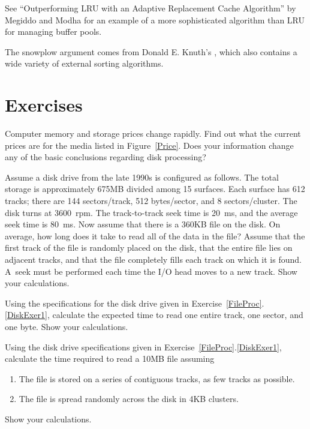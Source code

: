 See ``Outperforming LRU with an Adaptive Replacement Cache Algorithm''
by Megiddo and Modha \cite{LRU} for an example of a more sophisticated
algorithm than LRU for managing buffer pools.

The snowplow argument comes from Donald E. Knuth's
 \cite{KnuthV3}, which also contains a
wide variety of external sorting algorithms.

\section{Exercises}

\begin{exercises}

\item
Computer memory and storage prices change
rapidly.
Find out what the current prices are for the media listed in
Figure~\ref{Price}.
Does your information change any of the basic conclusions regarding
disk processing?

\item
\label{DiskExer1}
Assume a disk drive
from the late 1990s is configured as follows.
The total storage is approximately 675MB divided among 15 surfaces.
Each surface has 612 tracks; there are 144 sectors/track,
512 bytes/sector, and  8 sectors/cluster.
The disk turns at 3600~rpm.
The track-to-track seek time is 20~ms, and the average seek time is
80~ms.
Now assume that there is a 360KB file on the disk.
On average, how long does it take to read all of the data in the file?
Assume that the first track of the file is randomly placed on the
disk, that the entire file lies on adjacent tracks, and that the file
completely fills each track on which it is found.
A~seek must be performed each time the I/O head moves to a
new track.
Show your calculations.

\item
Using the specifications for the disk drive given in
Exercise~\ref{FileProc}.\ref{DiskExer1}, calculate the expected time
to read one entire track, one sector, and one byte.
Show your calculations.

\item
Using the disk drive specifications given in
Exercise~\ref{FileProc}.\ref{DiskExer1},
calculate the time required to read a 10MB file assuming
\begin{enumerate}
\item The file is stored on a series of contiguous tracks, as few
tracks as possible.
\item The file is spread randomly across the disk in 4KB clusters.
\end{enumerate}
\noindent Show your calculations.


\end{exercises}
